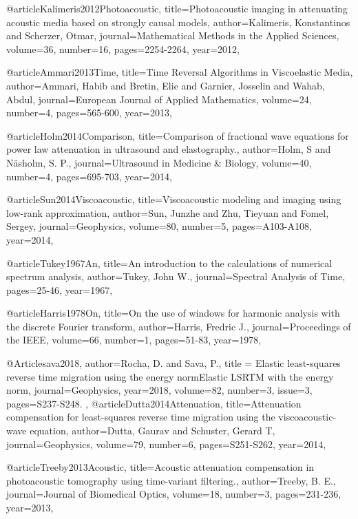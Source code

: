 @article{Kalimeris2012Photoacoustic,
  title={Photoacoustic imaging in attenuating acoustic media based on strongly causal models},
  author={Kalimeris, Konstantinos and Scherzer, Otmar},
  journal={Mathematical Methods in the Applied Sciences},
  volume={36},
  number={16},
  pages={2254-2264},
  year={2012},
}

@article{Ammari2013Time,
  title={Time Reversal Algorithms in Viscoelastic Media},
  author={Ammari, Habib and Bretin, Elie and Garnier, Josselin and Wahab, Abdul},
  journal={European Journal of Applied Mathematics},
  volume={24},
  number={4},
  pages={565-600},
  year={2013},
}

@article{Holm2014Comparison,
  title={Comparison of fractional wave equations for power law attenuation in ultrasound and elastography.},
  author={Holm, S and Näsholm, S. P.},
  journal={Ultrasound in Medicine \& Biology},
  volume={40},
  number={4},
  pages={695-703},
  year={2014},
}

@article{Sun2014Viscoacoustic,
  title={Viscoacoustic modeling and imaging using low-rank approximation},
  author={Sun, Junzhe and Zhu, Tieyuan and Fomel, Sergey},
  journal={Geophysics},
  volume={80},
  number={5},
  pages={A103-A108},
  year={2014},
}

@article{Tukey1967An,
  title={An introduction to the calculations of numerical spectrum analysis},
  author={Tukey, John W.},
  journal={Spectral Analysis of Time},
  pages={25-46},
  year={1967},
}

@article{Harris1978On,
  title={On the use of windows for harmonic analysis with the discrete {F}ourier transform},
  author={Harris, Fredric J.},
  journal={Proceedings of the IEEE},
  volume={66},
  number={1},
  pages={51-83},
  year={1978},
}

@Article{sava2018,
  author={Rocha, D. and Sava, P.},
  title = {Elastic least-squares reverse time migration using the energy normElastic LSRTM with the energy norm},
  journal={Geophysics},
  year=2018,
  volume=82,
  number=3,
  issue=3,
  pages={S237-S248. },
}
@article{Dutta2014Attenuation,
  title={Attenuation compensation for least-squares reverse time migration using the viscoacoustic-wave equation},
  author={Dutta, Gaurav and Schuster, Gerard T},
  journal={Geophysics},
  volume={79},
  number={6},
  pages={S251-S262},
  year={2014},
}

@article{Treeby2013Acoustic,
  title={Acoustic attenuation compensation in photoacoustic tomography using time-variant filtering.},
  author={Treeby, B. E.},
  journal={Journal of Biomedical Optics},
  volume={18},
  number={3},
  pages={231-236},
  year={2013},
}

